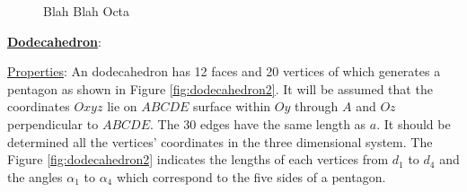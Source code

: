 \begin{center}
\begin{figure}[h]
\hfill
{}
\caption{Blah Blah Octa}
\label{fig:icosaPaths}
\end{figure}
\end{center}
%
\clearpage
\newpage
\noindent\uline{\textbf{Dodecahedron}}:


\noindent\uline{Properties}: 
An dodecahedron has 12 faces and 20 vertices of which generates a pentagon as shown in Figure \ref{fig:dodecahedron2}.
It will be assumed that the coordinates $Oxyz$ lie on $ABCDE$ surface within $Oy$ through $A$ and $Oz$ perpendicular to $ABCDE$.
The 30 edges have the same length as $a$. It should be determined all the vertices' coordinates in the three dimensional system.
The Figure \ref{fig:dodecahedron2} indicates the lengths of each vertices from $d_1$ to $d_4$ and the angles $\alpha_1$ to $\alpha_4$ which correspond to the five sides of a pentagon.

